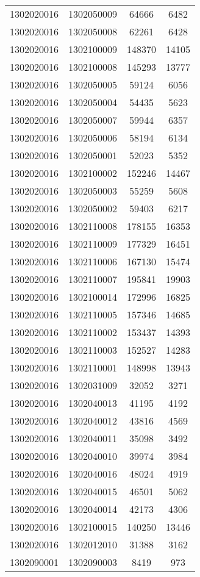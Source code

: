 \begin{longtable}{llcc}
1302020016 & 1302050009 & 64666 & 6482\\
1302020016 & 1302050008 & 62261 & 6428\\
1302020016 & 1302100009 & 148370 & 14105\\
1302020016 & 1302100008 & 145293 & 13777\\
1302020016 & 1302050005 & 59124 & 6056\\
1302020016 & 1302050004 & 54435 & 5623\\
1302020016 & 1302050007 & 59944 & 6357\\
1302020016 & 1302050006 & 58194 & 6134\\
1302020016 & 1302050001 & 52023 & 5352\\
1302020016 & 1302100002 & 152246 & 14467\\
1302020016 & 1302050003 & 55259 & 5608\\
1302020016 & 1302050002 & 59403 & 6217\\
1302020016 & 1302110008 & 178155 & 16353\\
1302020016 & 1302110009 & 177329 & 16451\\
1302020016 & 1302110006 & 167130 & 15474\\
1302020016 & 1302110007 & 195841 & 19903\\
1302020016 & 1302100014 & 172996 & 16825\\
1302020016 & 1302110005 & 157346 & 14685\\
1302020016 & 1302110002 & 153437 & 14393\\
1302020016 & 1302110003 & 152527 & 14283\\
1302020016 & 1302110001 & 148998 & 13943\\
1302020016 & 1302031009 & 32052 & 3271\\
1302020016 & 1302040013 & 41195 & 4192\\
1302020016 & 1302040012 & 43816 & 4569\\
1302020016 & 1302040011 & 35098 & 3492\\
1302020016 & 1302040010 & 39974 & 3984\\
1302020016 & 1302040016 & 48024 & 4919\\
1302020016 & 1302040015 & 46501 & 5062\\
1302020016 & 1302040014 & 42173 & 4306\\
1302020016 & 1302100015 & 140250 & 13446\\
1302020016 & 1302012010 & 31388 & 3162\\
1302090001 & 1302090003 & 8419 & 973\\

\end{longtable}
